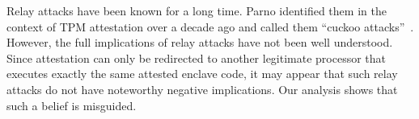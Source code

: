 Relay attacks have been known for a long time. Parno identified them in the context of TPM attestation over a decade ago and called them ``cuckoo attacks''~\cite{parno2008bootstrapping}. However, the full implications of relay attacks have not been well understood. Since attestation can only be redirected to another legitimate processor that executes exactly the same attested enclave code, it may appear that such relay attacks do not have noteworthy negative implications. Our analysis shows that such a belief is misguided.


